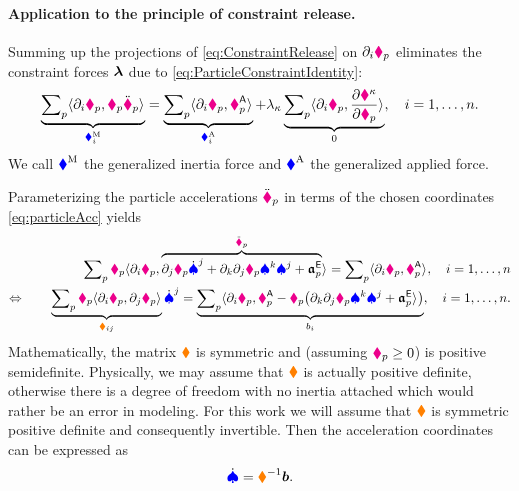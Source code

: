 \paragraph{Application to the principle of constraint release.}
Summing up the projections of \eqref{eq:ConstraintRelease} on $\dirDiff{\LidxI}\particlePos{\PidxI}$ eliminates the constraint forces $\LagrangeMult$ due to \eqref{eq:ParticleConstraintIdentity}:
\begin{align}\label{eq:ConstraintReleaseEliminated}
 \underbrace{\sumParticles \sProd{\dirDiff{\LidxI} \particlePos{\PidxI}}{\particleMass{\PidxI} \particlePosdd{\PidxI}}}_{\genForceInertiaCoeff{\LidxI}}
 = \underbrace{\sumParticles \sProd{\dirDiff{\LidxI} \particlePos{\PidxI}}{\particleForceImpressed{\PidxI}}}_{\genForceImpressedCoeff{\LidxI}}
 + \LagrangeMultCoeff{\CidxI} \underbrace{\sumParticles \sProd{\dirDiff{\LidxI} \particlePos{\PidxI}}{\pdiff[\particleGeoConstraintCoeff{\CidxI}]{\particlePos{\PidxI}}}}_{0},
 \quad \LidxI = 1,\ldots,\dimConfigSpace.
\end{align}
We call $\genForceInertia$ the generalized inertia force and $\genForceImpressed$ the generalized applied force.

Parameterizing the particle accelerations $\particlePosdd{\PidxI}$ in terms of the chosen coordinates \eqref{eq:particleAcc} yields 
\begin{align}
 \sumParticles \particleMass{\PidxI} \sProd{\dirDiff{\LidxI} \particlePos{\PidxI}}{\overbrace{\dirDiff{\LidxII} \particlePos{\PidxI} \sysVelCoeffd{\LidxII} + \dirDiff{\LidxIII} \dirDiff{\LidxII} \particlePos{\PidxI} \sysVelCoeff{\LidxIII} \sysVelCoeff{\LidxII} + \particleAccTime{\PidxI}}^{\particlePosdd{\PidxI}}}
 = \sumParticles \sProd{\dirDiff{\LidxI} \particlePos{\PidxI}}{\particleForceImpressed{\PidxI}},
 \quad \LidxI = 1,\ldots,\dimConfigSpace
\nonumber\\
\Leftrightarrow \qquad
 \underbrace{\sumParticles \particleMass{\PidxI} \sProd{\dirDiff{\LidxI} \particlePos{\PidxI}}{\dirDiff{\LidxII} \particlePos{\PidxI}}}_{\sysInertiaMatCoeff{\LidxI\LidxII}} \sysVelCoeffd{\LidxII}
 = \underbrace{\sumParticles \sProd{\dirDiff{\LidxI} \particlePos{\PidxI}}{\particleForceImpressed{\PidxI} - \particleMass{\PidxI} \big(\dirDiff{\LidxIII} \dirDiff{\LidxII} \particlePos{\PidxI} \sysVelCoeff{\LidxIII} \sysVelCoeff{\LidxII} + \particleAccTime{\PidxI}}\big)}_{\sysForceCoeff{\LidxI}},
 \quad \LidxI = 1,\ldots,\dimConfigSpace.
\end{align}
Mathematically, the matrix $\sysInertiaMat$ is symmetric and (assuming $\particleMass{\PidxI} \geq 0$) is positive semidefinite.
Physically, we may assume that $\sysInertiaMat$ is actually positive definite, otherwise there is a degree of freedom with no inertia attached which would rather be an error in modeling.
For this work we will assume that $\sysInertiaMat$ is symmetric positive definite and consequently invertible.
Then the acceleration coordinates can be expressed as 
\begin{align}
 \sysVeld = \sysInertiaMat^{-1} \sysForce.
\end{align}

